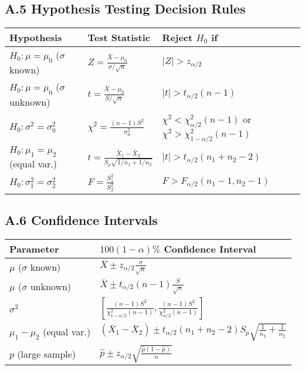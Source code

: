\documentclass[12pt,a4paper]{amsart}
\theoremstyle{remark}
\begin{document}
\subsection{A.5 Hypothesis Testing Decision Rules}

\begin{table}[h]
\centering
\begin{tabular}{|l|l|l|}
\hline
\textbf{Hypothesis} & \textbf{Test Statistic} & \textbf{Reject $H_0$ if} \\
\hline
$H_0: \mu = \mu_0$ ($\sigma$ known) & $Z = \frac{\bar{X}-\mu_0}{\sigma/\sqrt{n}}$ & $|Z| > z_{\alpha/2}$ \\
\hline
$H_0: \mu = \mu_0$ ($\sigma$ unknown) & $t = \frac{\bar{X}-\mu_0}{S/\sqrt{n}}$ & $|t| > t_{\alpha/2}(n-1)$ \\
\hline
$H_0: \sigma^2 = \sigma_0^2$ & $\chi^2 = \frac{(n-1)S^2}{\sigma_0^2}$ & $\chi^2 < \chi^2_{\alpha/2}(n-1)$ or $\chi^2 > \chi^2_{1-\alpha/2}(n-1)$ \\
\hline
$H_0: \mu_1 = \mu_2$ (equal var.) & $t = \frac{\bar{X}_1-\bar{X}_2}{S_p\sqrt{1/n_1+1/n_2}}$ & $|t| > t_{\alpha/2}(n_1+n_2-2)$ \\
\hline
$H_0: \sigma_1^2 = \sigma_2^2$ & $F = \frac{S_1^2}{S_2^2}$ & $F > F_{\alpha/2}(n_1-1,n_2-1)$ \\
\hline
\end{tabular}
\end{table}

\subsection{A.6 Confidence Intervals}

\begin{table}[h]
\centering
\begin{tabular}{|l|l|}
\hline
\textbf{Parameter} & \textbf{$100(1-\alpha)\%$ Confidence Interval} \\
\hline
$\mu$ ($\sigma$ known) & $\bar{X} \pm z_{\alpha/2}\frac{\sigma}{\sqrt{n}}$ \\
\hline
$\mu$ ($\sigma$ unknown) & $\bar{X} \pm t_{\alpha/2}(n-1)\frac{S}{\sqrt{n}}$ \\
\hline
$\sigma^2$ & $\left[\frac{(n-1)S^2}{\chi^2_{1-\alpha/2}(n-1)}, \frac{(n-1)S^2}{\chi^2_{\alpha/2}(n-1)}\right]$ \\
\hline
$\mu_1 - \mu_2$ (equal var.) & $(\bar{X}_1-\bar{X}_2) \pm t_{\alpha/2}(n_1+n_2-2)S_p\sqrt{\frac{1}{n_1}+\frac{1}{n_2}}$ \\
\hline
$p$ (large sample) & $\hat{p} \pm z_{\alpha/2}\sqrt{\frac{\hat{p}(1-\hat{p})}{n}}$ \\
\hline
\end{tabular}
\end{table}
\end{document}
